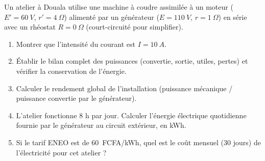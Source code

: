 \documentclass[11pt]{article}
\begin{document}
\begin{exercice}
Un atelier à Douala utilise une machine à coudre assimilée à un moteur ($E' = \SI{60}{V}$, $r' = \SI{4}{\Omega}$) alimenté par un générateur ($E = \SI{110}{V}$, $r = \SI{1}{\Omega}$) en série avec un rhéostat $R = \SI{0}{\Omega}$ (court-circuité pour simplifier).
\begin{enumerate}
\item Montrer que l'intensité du courant est $I = \SI{10}{A}$.
\item Établir le bilan complet des puissances (convertie, sortie, utiles, pertes) et vérifier la conservation de l'énergie.
\item Calculer le rendement global de l'installation (puissance mécanique / puissance convertie par le générateur).
\item L'atelier fonctionne 8 h par jour. Calculer l'énergie électrique quotidienne fournie par le générateur au circuit extérieur, en kWh.
\item Si le tarif ENEO est de \SI{60}{FCFA/kWh}, quel est le coût mensuel (30 jours) de l'électricité pour cet atelier ?
\end{enumerate}
\end{exercice}
\end{document}
